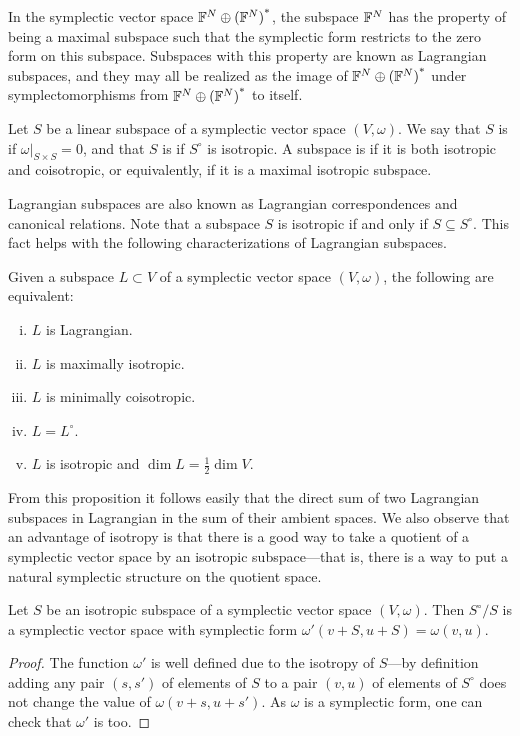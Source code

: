 In the symplectic vector space ${{\mathbb F}^{N} \oplus {({\mathbb F}^{N})}^\ast}$, the subspace ${\mathbb F}^N$ has the
property of being a maximal subspace such that the symplectic form restricts to
the zero form on this subspace. Subspaces with this property are known as Lagrangian
subspaces, and they may all be realized as the image of ${{\mathbb F}^{N} \oplus {({\mathbb F}^{N})}^\ast}$ 
under symplectomorphisms from ${{\mathbb F}^{N} \oplus {({\mathbb F}^{N})}^\ast}$ to itself.

\begin{definition} 
  Let $S$ be a linear subspace of a symplectic vector space $(V,\omega)$. We say
  that $S$ is  if $\omega|_{S \times S} = 0$, and that $S$ is
   if $S^\circ$ is isotropic. A subspace is
   if it is both isotropic and coisotropic, or equivalently, if it  
  is a maximal isotropic subspace.
\end{definition}

Lagrangian subspaces are also known as Lagrangian correspondences and canonical
relations. Note that a subspace $S$ is isotropic if and only if $S \subseteq
S^\circ$. This fact helps with the following characterizations of Lagrangian
subspaces.

\begin{proposition} \label{lagrangian_characterization} 
  Given a subspace $L \subset V$ of a symplectic vector space $(V,\omega)$, the
  following are equivalent: 
  \begin{enumerate}[(i)] 
    \item $L$ is Lagrangian.  
    \item $L$ is maximally isotropic.  
    \item $L$ is minimally coisotropic.  
    \item $L = L^\circ$.  
    \item $L$ is isotropic and $\dim L = \frac12 \dim V$.
  \end{enumerate} 
\end{proposition}

From this proposition it follows easily that the direct sum of two Lagrangian
subspaces in Lagrangian in the sum of their ambient spaces. We also observe that
an advantage of isotropy is that there is a good way to take a quotient of a
symplectic vector space by an isotropic subspace---that is, there is a way to
put a natural symplectic structure on the quotient space.

\begin{proposition}
  Let $S$ be an isotropic subspace of a symplectic vector space $(V,\omega)$.
  Then $S^\circ/S$ is a symplectic vector space with symplectic form
  $\omega'(v+S,u+S) = \omega(v,u)$.
\end{proposition}
\begin{proof} 
  The function $\omega'$ is well defined due to the isotropy of
  $S$---by definition adding any pair $(s,s')$ of elements of $S$ to a pair
  $(v,u)$ of elements of $S^\circ$ does not change the value of
  $\omega(v+s,u+s')$. As $\omega$ is a symplectic form, one can check that
  $\omega'$ is too.  
\end{proof}

